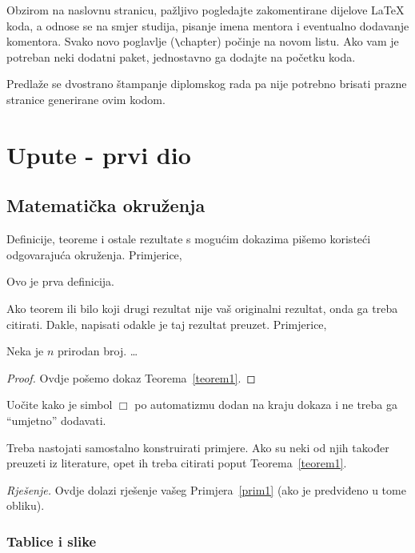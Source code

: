 \documentclass{mathos}
\begin{document}
\bigskip
\noindent
Obzirom na naslovnu stranicu, pažljivo pogledajte zakomentirane dijelove LaTeX koda, a odnose se na smjer studija, pisanje imena mentora i eventualno dodavanje komentora.
Svako novo poglavlje ({\verb $\$chapter}) počinje na novom listu. Ako vam je potreban neki dodatni paket, jednostavno ga dodajte na početku koda.

\bigskip
\noindent
Predlaže se dvostrano štampanje diplomskog rada pa nije potrebno brisati prazne stranice generirane ovim kodom.


\chapter{Upute - prvi dio}\label{poglavlje_1}

\section{Matematička okruženja}

Definicije, teoreme i ostale rezultate s mogućim dokazima pišemo koristeći odgovarajuća okruženja. Primjerice,
\begin{defin}
Ovo je prva definicija.
\end{defin}
Ako teorem ili bilo koji drugi rezultat nije vaš originalni rezultat, onda ga treba citirati. Dakle, napisati odakle je taj rezultat preuzet. Primjerice,
\begin{teorem}  \label{teorem1}
Neka je $n$ prirodan broj. \dots
\end{teorem}

\begin{proof}
Ovdje pošemo dokaz Teorema~\ref{teorem1}.
\end{proof}
Uočite kako je simbol $\Box$ po automatizmu dodan na kraju dokaza i ne treba ga ``umjetno'' dodavati.

\begin{primjer}\label{prim1}
Treba nastojati samostalno konstruirati primjere. Ako su neki od njih također preuzeti iz literature, opet ih treba citirati poput Teorema~\ref{teorem1}.
\end{primjer}
\noindent
{\it Rješenje.} Ovdje dolazi rješenje vašeg Primjera~\ref{prim1} (ako je predviđeno u tome obliku).

\subsection{Tablice i slike}
\end{document}
